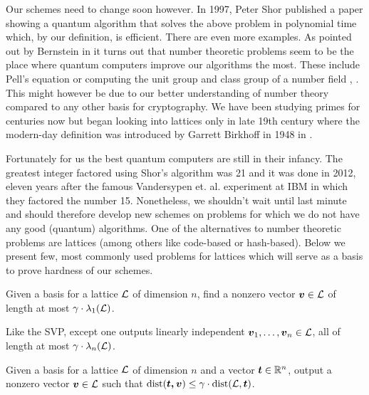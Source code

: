 Our schemes need to change soon however. In 1997, Peter Shor published a paper \cite{shor} showing a quantum algorithm that solves the above problem in polynomial time which, by our definition, is efficient. There are even more examples. As pointed out by Bernstein in \cite{bernstein} it turns out that number theoretic problems seem to be the place where quantum computers improve our algorithms the most. These include Pell's equation \cite{pell} or computing the unit group and class group of a number field \cite{17}, \cite{37}. This might however be due to our better understanding of number theory compared to any other basis for cryptography. We have been studying primes for centuries now but began looking into lattices only in late 19th century where the modern-day definition was introduced by Garrett Birkhoff in 1948 in \cite{birkhoff}.

Fortunately for us the best quantum computers are still in their infancy. The greatest integer factored using Shor's algorithm was 21 \cite{21} and it was done in 2012, eleven years after the famous Vandersypen et. al. experiment at IBM \cite{15} in which they factored the number 15. Nonetheless, we shouldn't wait until last minute and should therefore develop new schemes on problems for which we do not have any good (quantum) algorithms. One of the alternatives to number theoretic problems are lattices (among others like code-based or hash-based). Below we present few, most commonly used problems for lattices which will serve as a basis to prove hardness of our schemes.
\begin{definition}
	Given a basis for a lattice $\mathcal{L}$ of dimension $n$, find a nonzero vector $\boldsymbol{v} \in \mathcal{L}$ of length at most $\gamma \cdot \lambda_1(\mathcal{L})$.
\end{definition}

\begin{definition}
	Like the SVP, except one outputs linearly independent $\boldsymbol{v}_1,\ldots , \boldsymbol{v}_n\in \mathcal{L}$, all of length at most $\gamma \cdot \lambda_n(\mathcal{L})$.
\end{definition}
\begin{definition}
	Given a basis for a lattice $\mathcal{L}$ of dimension $n$ and a vector $\boldsymbol{t} \in \mathbb{R}^n$, output a nonzero vector $\boldsymbol{v} \in \mathcal{L}$ such that $\text{dist}(\boldsymbol{t,v}) \leq \gamma \cdot \text{dist}(\mathcal{L}, \boldsymbol{t})$.
\end{definition}

